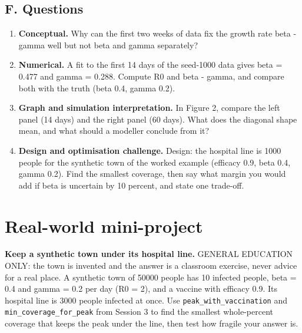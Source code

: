 \documentclass[11pt,a4paper]{article}
\begin{document}
\subsection*{F. Questions}
\begin{enumerate}[nosep]
\item \textbf{Conceptual.} Why can the first two weeks of data fix the growth rate beta - gamma well but not beta and gamma separately?
\item \textbf{Numerical.} A fit to the first 14 days of the seed-1000 data gives beta = 0.477 and gamma = 0.288. Compute R0 and beta - gamma, and compare both with the truth (beta 0.4, gamma 0.2).
\item \textbf{Graph and simulation interpretation.} In Figure 2, compare the left panel (14 days) and the right panel (60 days). What does the diagonal shape mean, and what should a modeller conclude from it?
\item \textbf{Design and optimisation challenge.} Design: the hospital line is 1000 people for the synthetic town of the worked example (efficacy 0.9, beta 0.4, gamma 0.2). Find the smallest coverage, then say what margin you would add if beta is uncertain by 10 percent, and state one trade-off.
\end{enumerate}

\section{Real-world mini-project}
\textbf{Keep a synthetic town under its hospital line.} GENERAL EDUCATION ONLY: the town is invented and the answer is a classroom exercise, never advice for a real place. A synthetic town of 50000 people has 10 infected people, beta = 0.4 and gamma = 0.2 per day (R0 = 2), and a vaccine with efficacy 0.9. Its hospital line is 3000 people infected at once. Use \texttt{peak\_with\_vaccination} and \texttt{min\_coverage\_for\_peak} from Session 3 to find the smallest whole-percent coverage that keeps the peak under the line, then test how fragile your answer is.
\end{document}
